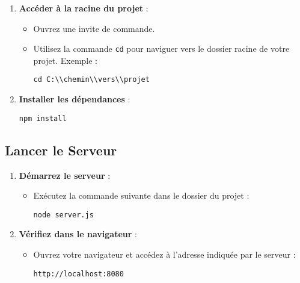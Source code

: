 \documentclass[a4paper,12pt]{article}
\begin{document}
\begin{enumerate}
    \item \textbf{Accéder à la racine du projet} :
    \begin{itemize}
        \item Ouvrez une invite de commande.
        \item Utilisez la commande \texttt{cd} pour naviguer vers le dossier racine de votre projet. Exemple :
        \begin{verbatim}
cd C:\\chemin\\vers\\projet
        \end{verbatim}
    \end{itemize}

    \item \textbf{Installer les dépendances} :
    \begin{itemize}
        \begin{verbatim}
npm install
        \end{verbatim}
    \end{itemize}
\end{enumerate}

\subsection{Lancer le Serveur}

\begin{enumerate}

    \item \textbf{Démarrez le serveur} :
    \begin{itemize}
        \item Exécutez la commande suivante dans le dossier du projet :
        \begin{verbatim}
node server.js
        \end{verbatim}
    \end{itemize}
    \item \textbf{Vérifiez dans le navigateur} :
    \begin{itemize}
        \item Ouvrez votre navigateur et accédez à l'adresse indiquée par le serveur :
        \begin{verbatim}
http://localhost:8080
        \end{verbatim}
    \end{itemize}
    
\end{enumerate}
\end{document}
